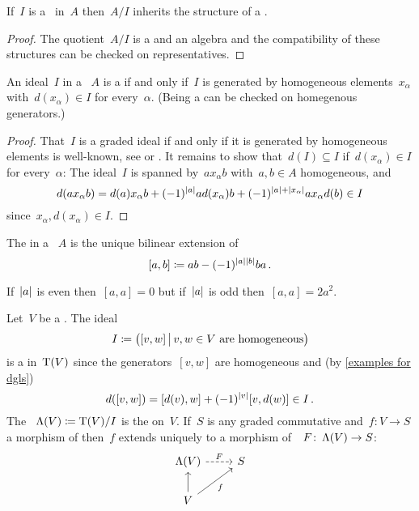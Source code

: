 \documentclass[a4paper,10pt,headings=standardclasses]{scrartcl}
\begin{document}
\begin{lemma}
  \label{quotient of dga}
  If~$I$ is a~{\dgi} in~$A$ then~$A/I$ inherits the structure of a {\dga}.
\end{lemma}

\begin{proof}
  The quotient~$A/I$ is a {\dgv} and an algebra and the compatibility of these structures can be checked on representatives.
\end{proof}

\begin{lemma}
  An ideal~$I$ in a {\dga}~$A$ is a {\dgi} if and only if~$I$ is generated by homogeneous elements~$x_\alpha$ with~$d(x_\alpha) \in I$ for every~$\alpha$.
  (Being a {\dgi} can be checked on homegenous generators.)
\end{lemma}

\begin{proof}
  That~$I$ is a graded ideal if and only if it is generated by homogeneous elements is  well-known, see \cite[IX, 2.5]{lang} or \cite[II.{\S}11.3]{bourbaki}.
  It remains to show that~$d(I) \subseteq I$ if~$d(x_\alpha) \in I$ for every~$\alpha$:
  The ideal~$I$ is spanned by~$a x_\alpha b$ with~$a, b \in A$ homogeneous, and
  \[
    d(a x_\alpha b)
    =
      d(a) x_\alpha b
    + (-1)^{\lvert a\rvert} a d(x_\alpha) b
    + (-1)^{\lvert a\rvert + \lvert x_\alpha\rvert} a x_\alpha d(b)
    \in
    I
  \]
  since~$x_\alpha, d(x_\alpha) \in I$.
\end{proof}

\begin{definition}
  The  in a {\dga}~$A$ is the unique bilinear extension of
  \[
    [a,b]
    \coloneqq
    ab - (-1)^{\lvert a\rvert\lvert b\rvert} ba \,.
  \]
\end{definition}

\begin{warning}
  \label{warning self-commutator for dga}
  If~$\lvert a\rvert$ is even then~$[a,a] = 0$ but if~$\lvert a\rvert$ is odd then~$[a,a] = 2 a^2$.
\end{warning}

\begin{example}
  \label{dg symmetric algebra}
  Let~$V$ be a {\dgv}.
  The ideal
  \[
    I
    \defined
    \bigl(
      [v,w]
    \suchthat[\big]
      \text{$v,w \in V$ are homogeneous}
    \bigr)
  \]
  is a {\dgi} in~$\operatorname{T}(V)$ since the generators~$[v,w]$ are homogeneous and (by \cref{examples for dgls})
  \[
    d([v,w])
    =
    [d(v), w] + (-1)^{\lvert v\rvert} [v, d(w)]
    \in
    I \,.
  \]
  The {\dga}~$\operatorname{\Lambda}(V) \coloneqq \operatorname{T}(V)/I$ is the  on~$V$.
  If~$S$ is any graded commutative {\dga} and~$f \colon V \to S$ a morphism of {\dgvs} then~$f$ extends uniquely to a morphism of~{\dgas}~$F \colon \operatorname{\Lambda}(V) \to S$:
  \[
    \begin{tikzcd}
      \dgSymm(V)
      \arrow[dashed]{r}[above]{F}
      &
      S
      \\
      V
      \arrow{u}
      \arrow{ur}[below right]{f}
      &
      {}
    \end{tikzcd}
  \]

\end{example}
\end{document}

